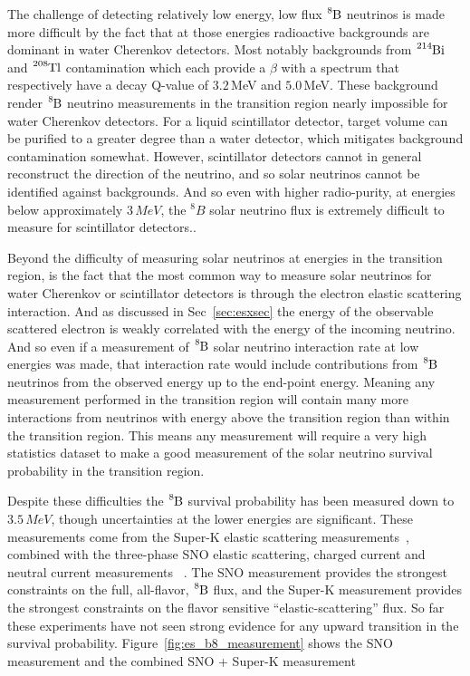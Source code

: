 The challenge of detecting relatively low energy, low flux $\ce{^{8}B}$ neutrinos
is made more difficult by the fact that at those energies radioactive backgrounds
are dominant in water Cherenkov detectors.
Most notably backgrounds from $\ce{^{214}Bi}$ and $\ce{^{208}Tl}$ contamination
which each provide a $\beta$ with a spectrum that respectively have a decay
Q-value of $3.2$\,MeV and $5.0$\,MeV.
These background render $\ce{^{8}B}$ neutrino measurements in the transition
region nearly impossible for water Cherenkov detectors.
For a liquid scintillator detector, target volume can be purified to a greater
degree than a water detector, which mitigates
background contamination somewhat.
However, scintillator detectors cannot in general reconstruct the direction
of the neutrino, and so solar neutrinos cannot be identified against backgrounds.
And so even with higher radio-purity, at energies below approximately $3\,MeV$,
the $^{8}B$ solar neutrino flux is extremely difficult to measure for scintillator detectors..

Beyond the difficulty of measuring solar neutrinos at energies in the transition
region, is the fact that the most common way to measure solar neutrinos for
water Cherenkov or scintillator detectors
is through the electron elastic scattering interaction.
And as discussed in Sec~\ref{sec:esxsec} the energy of the observable
scattered electron is weakly correlated with the energy of the incoming neutrino.
And so even if a measurement of $\ce{^{8}B}$ solar neutrino interaction rate at low energies was
made, that interaction rate would include contributions from $\ce{^{8}B}$ neutrinos
from the observed energy up to the end-point energy.
Meaning any measurement performed in the transition region will contain many
more interactions from neutrinos with energy above the transition region than within
the transition region.
This means any measurement will require a very high statistics dataset to make
a good measurement of the solar neutrino survival probability in the transition
region.

Despite these difficulties the $\ce{^{8}B}$ survival probability has been measured
down to $3.5\,MeV$, though uncertainties at the lower energies are significant.
These measurements come from the Super-K elastic scattering measurements~\citep{superk4}, combined
with the three-phase SNO elastic scattering, charged current and neutral current measurements
~\citep{sno_combined}.
The SNO measurement provides the strongest constraints on the full, all-flavor, $\ce{^{8}B}$
flux, and the Super-K measurement provides the strongest constraints on the
flavor sensitive ``elastic-scattering'' flux.
So far these experiments have not seen strong evidence for any
upward transition in the survival probability.
Figure~\ref{fig:es_b8_measurement} shows the SNO measurement
and the combined SNO + Super-K  measurement

